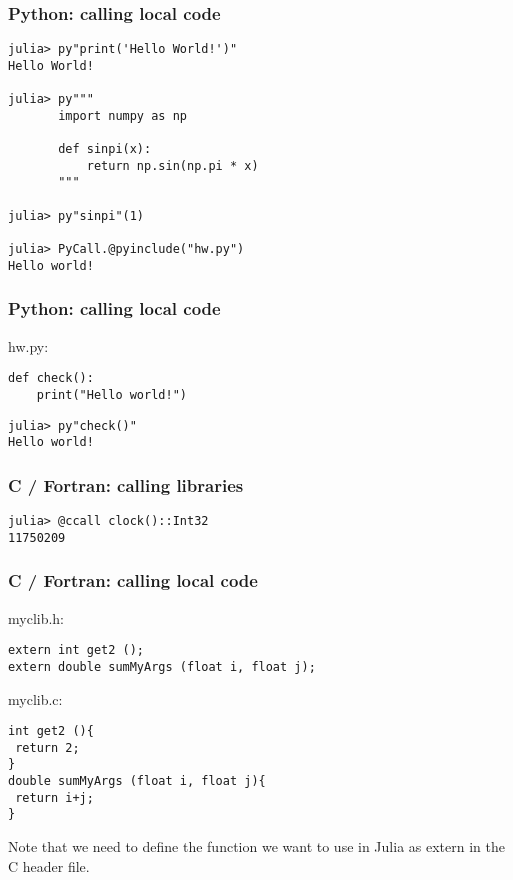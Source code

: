 \documentclass{beamer}
\begin{document}
\begin{frame}[fragile]
\frametitle{Python: calling local code}
\begin{lstlisting}
julia> py"print('Hello World!')"
Hello World!

julia> py"""
       import numpy as np

       def sinpi(x):
           return np.sin(np.pi * x)
       """

julia> py"sinpi"(1)

julia> PyCall.@pyinclude("hw.py")
Hello world!

\end{lstlisting}
\end{frame}

\begin{frame}[fragile]
\frametitle{Python: calling local code}

hw.py:
\begin{lstlisting}
def check():
    print("Hello world!")
\end{lstlisting}

\begin{lstlisting}
julia> py"check()"
Hello world!
\end{lstlisting}
\end{frame}

\begin{frame}[fragile]
\frametitle{C / Fortran: calling libraries}
\begin{lstlisting}
julia> @ccall clock()::Int32
11750209
\end{lstlisting}
\end{frame}

\begin{frame}[fragile]
\frametitle{C / Fortran: calling local code}
myclib.h:

\begin{lstlisting}
extern int get2 ();
extern double sumMyArgs (float i, float j);
\end{lstlisting}

myclib.c:

\begin{lstlisting}
int get2 (){
 return 2;
}
double sumMyArgs (float i, float j){
 return i+j;
}
\end{lstlisting}
Note that we need to define the function we want to use in Julia as extern in the C header file.

\end{frame}
\end{document}
